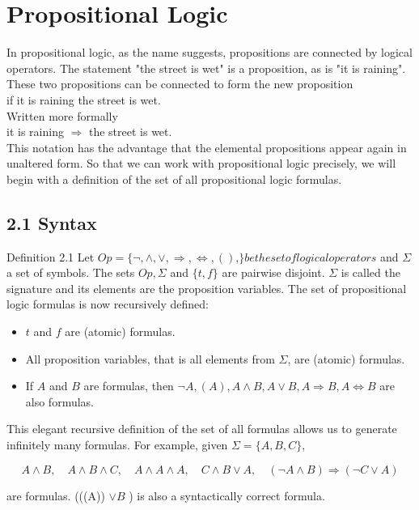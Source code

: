 \documentclass[10pt]{book}
\begin{document}
\section*{Propositional Logic}
In propositional logic, as the name suggests, propositions are connected by logical operators. The statement "the street is wet" is a proposition, as is "it is raining". These two propositions can be connected to form the new proposition\\

if it is raining the street is wet.\\
Written more formally\\
it is raining $\Rightarrow$ the street is wet.\\
This notation has the advantage that the elemental propositions appear again in unaltered form. So that we can work with propositional logic precisely, we will begin with a definition of the set of all propositional logic formulas.

\subsection*{2.1 Syntax}
Definition 2.1 Let $O p=\{\neg, \wedge, \vee, \Rightarrow, \Leftrightarrow,()$,$\} be the set of logical operators$ and $\Sigma$ a set of symbols. The sets $O p, \Sigma$ and $\{t, f\}$ are pairwise disjoint. $\Sigma$ is called the signature and its elements are the proposition variables. The set of propositional logic formulas is now recursively defined:

\begin{itemize}
  \item $t$ and $f$ are (atomic) formulas.
  \item All proposition variables, that is all elements from $\Sigma$, are (atomic) formulas.
  \item If $A$ and $B$ are formulas, then $\neg A,(A), A \wedge B, A \vee B, A \Rightarrow B, A \Leftrightarrow B$ are also formulas.
\end{itemize}

This elegant recursive definition of the set of all formulas allows us to generate infinitely many formulas. For example, given $\Sigma=\{A, B, C\}$,

$$
A \wedge B, \quad A \wedge B \wedge C, \quad A \wedge A \wedge A, \quad C \wedge B \vee A, \quad(\neg A \wedge B) \Rightarrow(\neg C \vee A)
$$

are formulas. (((A)) $\vee B$ ) is also a syntactically correct formula.
\end{document}
